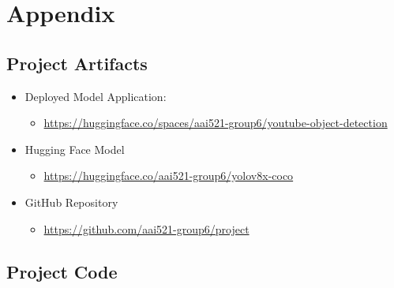\documentclass[10pt]{extarticle}
\begin{document}
\printbibliography

\newpage


\section{Appendix}

\subsection{Project Artifacts}

\begin{itemize}

    \item Deployed Model Application:
    \begin{itemize}
        \item \url{https://huggingface.co/spaces/aai521-group6/youtube-object-detection}
    \end{itemize}

    \item Hugging Face Model
    \begin{itemize}
        \item \url{https://huggingface.co/aai521-group6/yolov8x-coco}
    \end{itemize}

    \item GitHub Repository
    \begin{itemize}
        \item \url{https://github.com/aai521-group6/project}
    \end{itemize}
\end{itemize}

\subsection{Project Code}

\newpage

\clearpage

\end{document}
